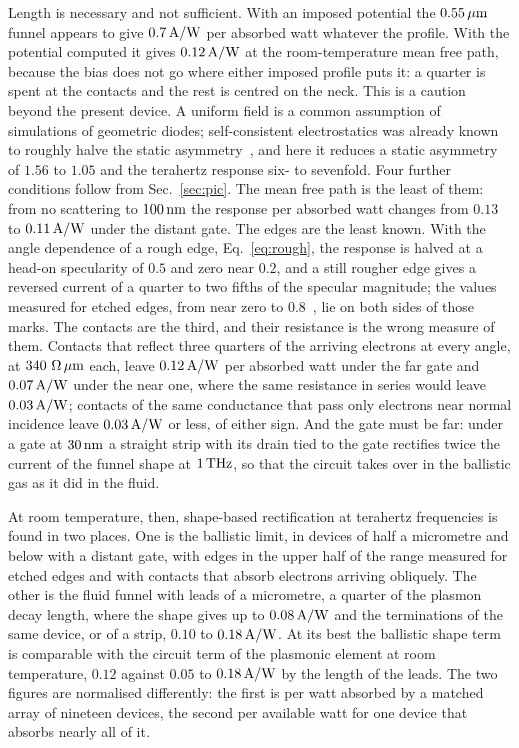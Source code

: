 Length is necessary and not sufficient. With an imposed potential the
$0.55\,\mu\mathrm{m}$ funnel appears to give $0.7\,\mathrm{A/W}$ per
absorbed watt whatever the profile. With the potential computed it gives
$0.12\,\mathrm{A/W}$ at the room-temperature mean free path, because the bias does
not go where either imposed profile puts it: a quarter is spent at the
contacts and the rest is centred on the neck. This is a caution beyond the
present device. A uniform field is a common assumption of simulations of
geometric diodes; self-consistent electrostatics was already known to
roughly halve the static asymmetry~\cite{truccolo2024comprehensive}, and
here it reduces a static asymmetry of $1.56$ to $1.05$ and the terahertz
response six- to sevenfold. Four further conditions follow from
Sec.~\ref{sec:pic}. The mean free path is the least of them: from no
scattering to $100\,\mathrm{nm}$ the response per absorbed watt changes from $0.13$
to $0.11\,\mathrm{A/W}$ under the distant gate. The edges are the least known. With
the angle dependence of a rough edge, Eq.~\eqref{eq:rough}, the response
is halved at a head-on specularity of $0.5$ and zero near $0.2$, and a
still rougher edge gives a reversed current of a quarter to two fifths of
the specular magnitude; the values measured for etched
edges, from near zero to
$0.8$~\cite{taychatanapat2013electrically,masubuchi2012boundary,barnard2017absorptive,berdyugin2020minibands},
lie on both sides of those marks. The contacts are the third, and
their resistance is the wrong measure of them. Contacts that reflect
three quarters of the arriving electrons at every angle, at
$340\ \Omega\,\mu\mathrm{m}$ each, leave $0.12\,\mathrm{A/W}$ per absorbed watt under the far
gate and $0.07\,\mathrm{A/W}$ under the near one, where the same resistance in
series would leave $0.03\,\mathrm{A/W}$; contacts of the same conductance that pass
only electrons near normal incidence leave $0.03\,\mathrm{A/W}$ or less, of
either sign. And the gate
must be far: under
a gate at $30\,\mathrm{nm}$ a straight strip with its drain tied to the gate
rectifies twice the current of the funnel shape at $1\,\mathrm{THz}$, so that the
circuit takes over in the ballistic gas as it did in the fluid.

At room temperature, then, shape-based rectification at terahertz
frequencies is found in two places. One is the ballistic limit,
in devices of half a micrometre and below
with a distant gate, with edges in the upper half of the range
measured for etched edges and with contacts that absorb electrons
arriving obliquely. The other is the fluid funnel with leads of a
micrometre, a quarter of the plasmon decay length, where the shape gives up to
$0.08\,\mathrm{A/W}$ and the terminations of the same device, or of a strip,
$0.10$ to $0.18\,\mathrm{A/W}$. At its best the ballistic shape term
is comparable with the circuit term of the plasmonic
element at room temperature, $0.12$ against $0.05$ to $0.18\,\mathrm{A/W}$ by the
length of the leads. The
two figures are normalised differently: the first is per watt absorbed by
a matched array of nineteen devices, the second per available watt for
one device that absorbs nearly all of it.

